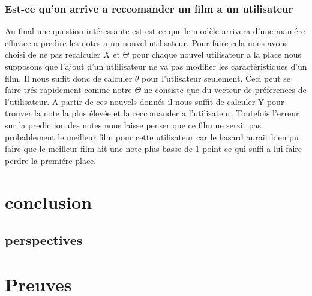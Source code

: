 \documentclass[a4paper,10pt]{article}
\begin{document}
\subsubsection{Est-ce qu'on arrive a reccomander un film a un utilisateur}
Au final une question intéressante est est-ce que le modèle arrivera d'une maniére efficace a predire les notes a un nouvel utilisateur. Pour faire cela nous avons
choisi de ne pas recalculer $X$ et $\Theta$ pour chaque nouvel utilisateur a la place nous supposons que l'ajout d'un utlilisateur ne va pas modifier
les caractéristiques d'un film. Il nous suffit donc de calculer $\theta$ pour l'utlisateur seulement. Ceci peut se faire trés rapidement comme notre $\Theta$ ne
consiste que du vecteur de préferences de l'utilisateur. A partir de ces nouvels donnés il nous suffit de calculer Y pour trouver la note la plus élevée et la reccomander
a l'utilisateur. Toutefois l'erreur sur la prediction des notes nous laisse penser que ce film ne serzit pas probablement le meilleur film
pour cette utilisateur car le hasard aurait bien pu faire que le meilleur film ait une note plus basse de 1 point ce qui suffi a lui faire perdre la premiére place.
\section{conclusion}

\subsection{perspectives}
\appendix
\section{Preuves}
\end{document}
